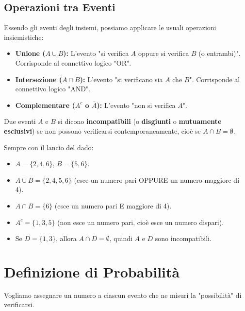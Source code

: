 \subsection{Operazioni tra Eventi}
Essendo gli eventi degli insiemi, possiamo applicare le usuali operazioni insiemistiche:
\begin{itemize}
    \item \textbf{Unione ($A \cup B$):} L'evento "si verifica $A$ oppure si verifica $B$ (o entrambi)". Corrisponde al connettivo logico "OR".
    \item \textbf{Intersezione ($A \cap B$):} L'evento "si verificano sia $A$ che $B$". Corrisponde al connettivo logico "AND".
    \item \textbf{Complementare ($A^c$ o $\bar{A}$):} L'evento "non si verifica $A$".
\end{itemize}
Due eventi $A$ e $B$ si dicono \textbf{incompatibili} (o \textbf{disgiunti} o \textbf{mutuamente esclusivi}) se non possono verificarsi contemporaneamente, cioè se $A \cap B = \emptyset$.

\begin{example}
Sempre con il lancio del dado:
\begin{itemize}
    \item $A = \{2, 4, 6\}$, $B = \{5, 6\}$.
    \item $A \cup B = \{2, 4, 5, 6\}$ (esce un numero pari OPPURE un numero maggiore di 4).
    \item $A \cap B = \{6\}$ (esce un numero pari E maggiore di 4).
    \item $A^c = \{1, 3, 5\}$ (non esce un numero pari, cioè esce un numero dispari).
    \item Se $D = \{1, 3\}$, allora $A \cap D = \emptyset$, quindi $A$ e $D$ sono incompatibili.
\end{itemize}
\end{example}

\section{Definizione di Probabilità}
Vogliamo assegnare un numero a ciascun evento che ne misuri la "possibilità" di verificarsi.

